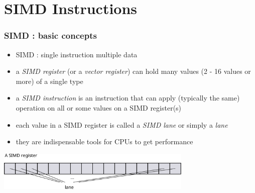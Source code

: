\documentclass[12pt,dvipdfmx]{beamer}
\newcommand{\ao}[1]{{\color{blue}#1}}
\begin{document}
\section{SIMD Instructions}

\begin{frame}
  \frametitle{SIMD : basic concepts}
  \begin{itemize}
  \item \ao{SIMD} : single instruction multiple data
  \item a \ao{\it SIMD register} (or a \ao{\it vector register})
    can hold many values (2 - 16 values or more) of a single type
  \item a \ao{\it SIMD instruction} is an instruction that
    can apply (typically the same) operation on all or some values on a SIMD register(s)
  \item each value in a SIMD register is called a \ao{\it SIMD lane}
    or simply a \ao{\it lane}
  \item they are indispensable tools for CPUs to get performance
  \end{itemize}

  \begin{center}
    \includegraphics[width=0.7\textwidth]{out/pdf/svg/simd_registers_1.pdf}
  \end{center}
\end{frame}
\end{document}

